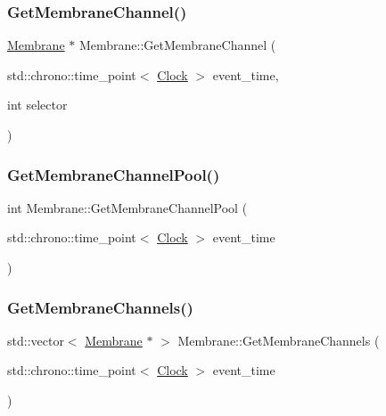 \mbox{\label{classMembrane_a1e2bdb800f0f38254214ea7cbdc06941}} 
\subsubsection{\texorpdfstring{Get\+Membrane\+Channel()}{GetMembraneChannel()}}
{\footnotesize\ttfamily \mbox{\hyperlink{classMembrane}{Membrane}} $\ast$ Membrane\+::\+Get\+Membrane\+Channel (\begin{DoxyParamCaption}\item[{std\+::chrono\+::time\+\_\+point$<$ \mbox{\hyperlink{universe_8h_a0ef8d951d1ca5ab3cfaf7ab4c7a6fd80}{Clock}} $>$}]{event\+\_\+time,  }\item[{int}]{selector }\end{DoxyParamCaption})}

\mbox{\label{classMembrane_a270278dd346edfe8c7bbd4c48929fdd5}} 
\subsubsection{\texorpdfstring{Get\+Membrane\+Channel\+Pool()}{GetMembraneChannelPool()}}
{\footnotesize\ttfamily int Membrane\+::\+Get\+Membrane\+Channel\+Pool (\begin{DoxyParamCaption}\item[{std\+::chrono\+::time\+\_\+point$<$ \mbox{\hyperlink{universe_8h_a0ef8d951d1ca5ab3cfaf7ab4c7a6fd80}{Clock}} $>$}]{event\+\_\+time }\end{DoxyParamCaption})\hspace{0.3cm}{\ttfamily [inline]}}

\mbox{\label{classMembrane_a7fac2929241b7ff9b8b7f1ec955b2cc5}} 
\subsubsection{\texorpdfstring{Get\+Membrane\+Channels()}{GetMembraneChannels()}}
{\footnotesize\ttfamily std\+::vector$<$ \mbox{\hyperlink{classMembrane}{Membrane}} $\ast$ $>$ Membrane\+::\+Get\+Membrane\+Channels (\begin{DoxyParamCaption}\item[{std\+::chrono\+::time\+\_\+point$<$ \mbox{\hyperlink{universe_8h_a0ef8d951d1ca5ab3cfaf7ab4c7a6fd80}{Clock}} $>$}]{event\+\_\+time }\end{DoxyParamCaption})}

